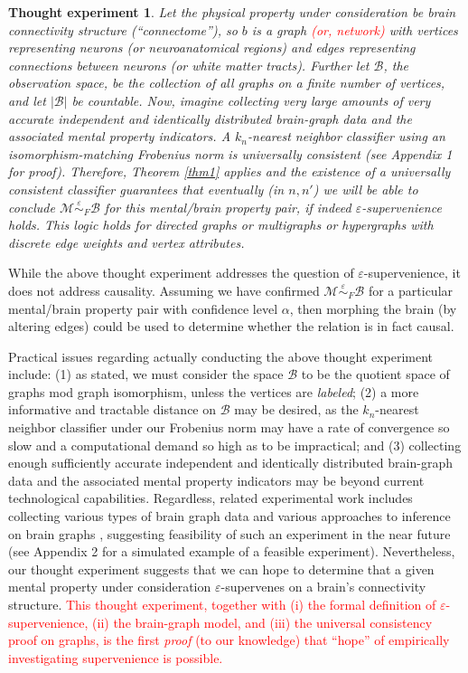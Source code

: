 \documentclass{article}
\newcommand{\mB}{\mathcal{B}}
\newcommand{\mM}{\mathcal{M}}
\newcommand{\MeB}{\mM \overset{\varepsilon}{{\sim}}_F \mB}
\providecommand{\tr}[1]{\textcolor{red}{#1}}
\newtheorem{thex}{Thought experiment}
\begin{document}
\begin{thex}

Let the physical property under consideration be brain connectivity structure (``connectome''), so $b$ is a graph \tr{(or, network)} with vertices representing neurons (or neuroanatomical regions) and edges representing connections between neurons (or white matter tracts). Further let $\mB$, the observation space, be the collection of all graphs on a finite number of vertices, and let $|\mB|$ be countable. Now, imagine collecting very large amounts of very accurate independent and identically distributed brain-graph data and the associated mental property indicators. A $k_n$-nearest neighbor classifier using an isomorphism-matching Frobenius norm is universally consistent (see Appendix 1 for proof). Therefore, Theorem \ref{thm1} applies and the existence of a universally consistent classifier guarantees that eventually (in $n,n'$) we will be able to conclude $\MeB$ for this mental/brain property pair, if indeed $\varepsilon$-supervenience holds. This logic holds for directed graphs or multigraphs or hypergraphs with discrete edge weights and vertex attributes.

\end{thex}

While the above thought experiment addresses the question of $\varepsilon$-supervenience, it does not address causality. Assuming we have confirmed $\MeB$ for a particular mental/brain property pair with confidence level $\alpha$, then morphing the brain (by altering edges) could be used to determine whether the relation is in fact causal.

Practical issues regarding actually conducting the above thought experiment include: (1) as stated, we must consider the space $\mB$ to be the quotient space of graphs mod graph isomorphism, unless the vertices are {\it labeled}; (2) a more informative and tractable distance on $\mB$ may be desired, as the $k_n$-nearest neighbor classifier under our Frobenius norm may have a rate of convergence so slow and a computational demand so high as to be impractical; and (3) collecting enough sufficiently accurate independent and identically distributed brain-graph data and the associated mental property indicators may be beyond current technological capabilities. Regardless, related experimental work includes collecting various types of brain graph data \cite{WhiteBrenner86, DenkHorstmann04, BriggmanDenk06} and various approaches to inference on brain graphs \cite{MackeBorst08, Mishchenko09, LuLichtman09}, suggesting feasibility of such an experiment in the near future (see Appendix 2 for a simulated example of a feasible experiment). Nevertheless, our thought experiment suggests that we can hope to determine that a given mental property under consideration $\varepsilon$-supervenes on a brain's connectivity structure. \tr{This thought experiment, together with (i) the formal definition of $\varepsilon$-supervenience, (ii) the brain-graph model, and (iii) the universal consistency proof on graphs, is the first \emph{proof} (to our knowledge) that ``hope'' of empirically investigating supervenience is possible.}
\end{document}
